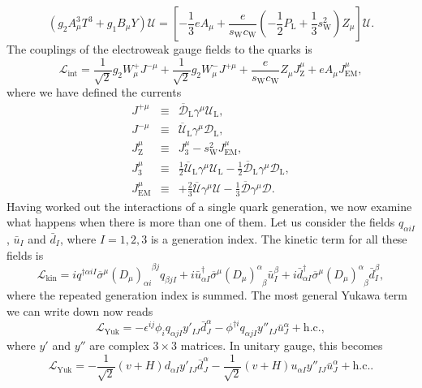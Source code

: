 \[(g_2A^3_{\mu}T^3 + g_1 B_{\mu} Y) \mathcal{U} = \left[ - \frac{1}{3}eA_{\mu} + \frac{e}{s_{\mathrm{W}} c_{\mathrm{W}}}( -\frac{1}{2}P_{\mathrm{L}} +\frac{1}{3}  s_{\mathrm{W}}^2)Z_{\mu} \right] \mathcal{U}.\]
The couplings of the electroweak gauge fields to the quarks is
\[\mathcal{L}_{\mathrm{int}} = \frac{1}{\sqrt{2}}g_2W_{\mu}^{+} J^{-\mu} + \frac{1}{\sqrt{2}}g_2W_{\mu}^{-} J^{+\mu} +  \frac{e}{s_{\mathrm{W}} c_{\mathrm{W}}} Z_{\mu}J_{\mathrm{Z}}^{\mu} + eA_{\mu}J^{\mu}_{\mathrm{EM}},\] 
where we have defined the currents
\begin{eqnarray}
J^{+\mu} &\equiv & \overline{\mathcal{D}}_{\mathrm{L}} \gamma^{\mu} \mathcal{U}_{\mathrm{L}} ,\nonumber \\
J^{-\mu} &\equiv & \overline{\mathcal{U}}_{\mathrm{L}} \gamma^{\mu} \mathcal{D}_{\mathrm{L}} ,\nonumber \\
J_{\mathrm{Z}}^{\mu} &\equiv & J_3^{\mu} - s_{\mathrm{W}}^2 J^{\mu}_{\mathrm{EM}} ,\nonumber \\
J_3^{\mu} &\equiv & \frac{1}{2}\overline{\mathcal{U}}_{\mathrm{L}} \gamma^{\mu} \mathcal{U}_{\mathrm{L}} - \frac{1}{2}\overline{\mathcal{D}}_{\mathrm{L}} \gamma^{\mu} \mathcal{D}_{\mathrm{L}} ,\nonumber \\
J^{\mu}_{\mathrm{EM}} &\equiv &  +\frac{2}{3}\overline{\mathcal{U}} \gamma^{\mu} \mathcal{U} - \frac{1}{3}\overline{\mathcal{D}} \gamma^{\mu} \mathcal{D} .\nonumber
\end{eqnarray}
Having worked out the interactions of a single quark generation, we now examine what happens when there is more than one of them.
Let us consider the fields $q_{\alpha iI}$, $\bar{u}_{I}$ and $\bar{d}_{I}$, where $I=1,2,3$ is a generation index. The kinetic term for all these fields is
\[\mathcal{L}_{\mathrm{kin}} = iq^{\dagger\alpha i I} \overline{\sigma}^{\mu}(D_{\mu})_{\alpha i}^{\phantom{\alpha i}\beta j} q_{\beta jI} + i\bar{u}_{\alpha I}^{\dagger}\overline{\sigma}^{\mu} (D_{\mu})^{\alpha}_{\phantom{\alpha}\beta}\bar{u}_I^{\beta} + i\bar{d}_{\alpha I}^{\dagger}\overline{\sigma}^{\mu} (D_{\mu})^{\alpha}_{\phantom{\alpha}\beta} \bar{d}_I^{\beta},\]
where the repeated generation index is summed. The most general Yukawa term we can write down now reads
\[\mathcal{L}_{\mathrm{Yuk}} = -\epsilon^{ij}\phi_i q_{\alpha jI}y'_{IJ} \bar{d}^{\alpha}_{J} -\phi^{\dagger i} q_{\alpha jI}y''_{IJ} \bar{u}^{\alpha}_{J} + \mathrm{h.c.},\]
where $y'$ and $y''$ are complex $3 \times 3$ matrices. 
In unitary gauge, this becomes
\[\mathcal{L}_{\mathrm{Yuk}} = -\frac{1}{\sqrt{2}}(v+H) d_{\alpha I}y'_{IJ} \bar{d}^{\alpha}_{J} -\frac{1}{\sqrt{2}}(v+H) u_{\alpha I}y''_{IJ} \bar{u}^{\alpha}_{J} + \mathrm{h.c.}.\]
